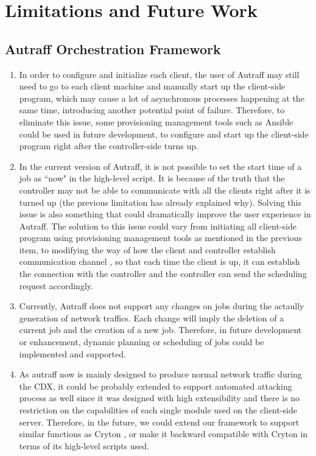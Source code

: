 \documentclass[12pt]{report}
\begin{document}
\section{Limitations and Future Work}
\subsection{Autraff Orchestration Framework}
\begin{enumerate}
\item In order to configure and initialize each client, the user of Autraff may still need to go to each client machine and manually start up the client-side program, which may cause a lot of asynchronous processes happening at the same time, introducing another potential point of failure. Therefore, to eliminate this issue, some provisioning management tools such as Ansible could be used in future development, to configure and start up the client-side program right after the controller-side turns up.
\item In the current version of Autraff, it is not possible to set the start time of a job as ``now" in the high-level script. It is because of the truth that the controller may not be able to communicate with all the clients right after it is turned up (the previous limitation has already explained why). Solving this issue is also something that could dramatically improve the user experience in Autraff. The solution to this issue could vary from initiating all client-side program using provisioning management tools as mentioned in the previous item, to modifying the way of how the client and controller establish communication channel , so that each time the client is up, it can establish the connection with the controller and the controller can send the scheduling request accordingly.\\
\item Currently, Autraff does not support any changes on jobs during the actaully generation of network traffics. Each change will imply the deletion of a current job and the creation of a new job. Therefore, in future development or enhancement, dynamic planning or scheduling of jobs could be implemented and supported.

\item As autraff now is mainly designed to produce normal network traffic during the CDX, it could be probably extended to support automated attacking process as well since it was designed with high extensibility and there is no restriction on the capabilities of each single module used on the client-side server. Therefore, in the future, we could extend our framework to support similar functions as Cryton \citep{Cryton}, or make it backward compatible with Cryton in terms of its high-level scripts used.
\end{enumerate}
\end{document}
